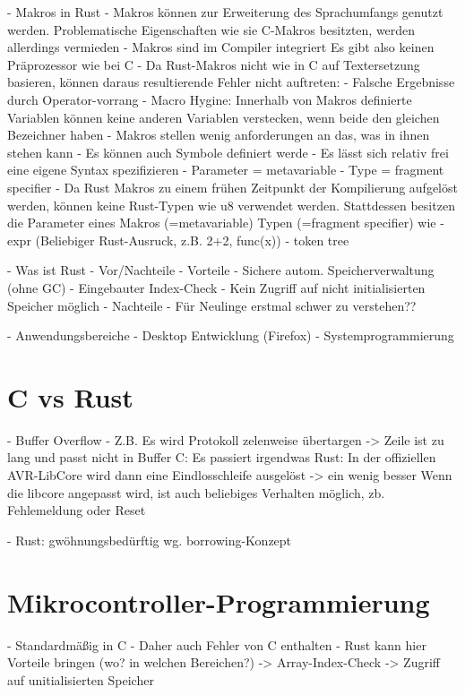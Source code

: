 \documentclass
[ 12pt,
  parskip=half %
]{scrreprt}
\begin{document}
- Makros in Rust
	- Makros können zur Erweiterung des Sprachumfangs genutzt werden. Problematische Eigenschaften wie sie C-Makros besitzten, werden allerdings vermieden
	-  Makros sind im Compiler integriert
		Es gibt also keinen Präprozessor wie bei C
	- Da Rust-Makros nicht wie in C auf Textersetzung basieren, können daraus resultierende Fehler nicht auftreten:
		- Falsche Ergebnisse durch Operator-vorrang
	- Macro Hygine: Innerhalb von Makros definierte Variablen können keine anderen Variablen verstecken, wenn beide den gleichen Bezeichner haben
	- Makros stellen wenig anforderungen an das, was in ihnen stehen kann
		- Es können auch Symbole definiert werde
		- Es lässt sich relativ frei eine eigene Syntax spezifizieren
	- Parameter = metavariable
	- Type = fragment specifier
	- Da Rust Makros zu einem frühen Zeitpunkt der Kompilierung aufgelöst werden, können keine Rust-Typen wie u8 verwendet werden. Stattdessen besitzen die Parameter eines Makros (=metavariable) Typen (=fragment specifier) wie 
	- expr (Beliebiger Rust-Ausruck, z.B. 2+2, func(x))
	- token tree 

- Was ist Rust
- Vor/Nachteile 
- Vorteile
	- Sichere autom. Speicherverwaltung (ohne GC)
	- Eingebauter Index-Check
	- Kein Zugriff auf nicht initialisierten Speicher möglich
- Nachteile
	- Für Neulinge erstmal schwer zu verstehen??
	
- Anwendungsbereiche
	- Desktop Entwicklung (Firefox)	
	- Systemprogrammierung

\section{C vs Rust}
- Buffer Overflow
	- Z.B. Es wird Protokoll zelenweise übertargen
		-> Zeile ist zu lang und passt nicht in Buffer
	C: Es passiert irgendwas
	Rust: In der offiziellen AVR-LibCore wird dann eine Eindlosschleife ausgelöst -> ein wenig besser
	Wenn die libcore angepasst wird, ist auch beliebiges Verhalten möglich, zb. Fehlemeldung oder Reset	
	
- Rust: gwöhnungsbedürftig wg. borrowing-Konzept
	
\section{Mikrocontroller-Programmierung}

- Standardmäßig in C
- Daher auch Fehler von C enthalten
- Rust kann hier Vorteile bringen
(wo? in welchen Bereichen?)
-> Array-Index-Check
-> Zugriff auf unitialisierten Speicher
\end{document}
